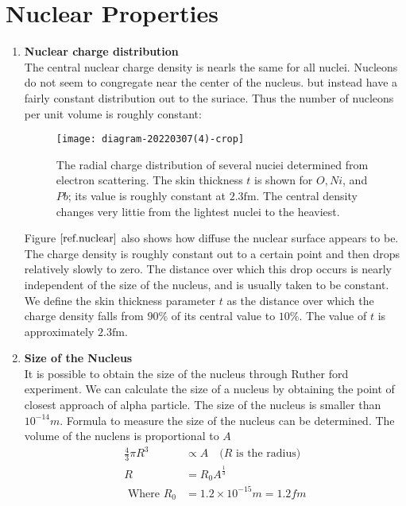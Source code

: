 \section{Nuclear Properties}
\begin{enumerate}
	\item \textbf{Nuclear charge distribution}\\
 The central nuclear charge density is nearls the same for all nuclei. Nucleons do not seem to congregate near the center of the nucleus. but instead have a fairly constant distribution out to the suriace. Thus the number of nucleons per unit volume is roughly constant:\\
\begin{figure}[H]
	\centering
	\texttt{[image: diagram-20220307(4)-crop]}
	\caption{ The radial charge distribution of several nuciei determined from electron scattering. The skin thickness $t$ is shown for $O, N i$, and $P b$; its value is roughly constant at $2.3 \mathrm{fm}$. The central density changes very littie from the lightest nuclei to the heaviest.}
	\label{ref.nuclear}
\end{figure}
 Figure $\ref{ref.nuclear}$ also shows how diffuse the nuclear surface appears to be. The charge density is roughly constant out to a certain point and then drops relatively slowly to zero. The distance over which this drop occurs is nearly independent of the size of the nucleus, and is usually taken to be constant. We define the skin thickness parameter $t$ as the distance over which the charge density falls from $90 \%$ of its central value to $10 \%$. The value of $t$ is approximately $2.3 \mathrm{fm}$.
	\item \textbf{Size of the Nucleus}\\
It is possible to obtain the size of the nucleus through Ruther ford experiment. We can calculate the size of a nucleus by obtaining the point of closest approach of alpha particle. The size of the nucleus is smaller than $10^{-14}m$. Formula to measure the size of the nucleus can be determined. The volume of the nuclens is proportional to  $A$ \\
\begin{align*}
\frac{4}{3}\pi R^3&\propto A\quad\text{($R$ is the radius) }\\
R&=R_0 A^\frac{1}{3}\\
\text{ Where }R_0&= 1.2\times 10^{-15}m=1.2 fm
\end{align*}
\\

\end{enumerate}
